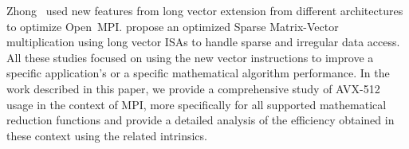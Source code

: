 \documentclass[5p,times,twocolumn]{elsarticle}
\newcommand{\ompi}[0]{Open~MPI\xspace}
\begin{document}
%
Zhong~\cite{dongsve, avxeurpmpi2020} used new features from long vector extension from different architectures
to optimize \ompi.
%
\cite{longvectarch} propose an optimized Sparse Matrix-Vector multiplication using long vector ISAs to handle sparse and irregular data access.
%
All these studies focused on using the new vector instructions to improve a specific application's or a specific mathematical algorithm performance.
In the work described in this paper, we provide a comprehensive study of AVX-512 usage in the context of MPI, more specifically for
all supported mathematical reduction functions and provide a detailed analysis of the efficiency obtained in these context using the related intrinsics.
%
\end{document}
